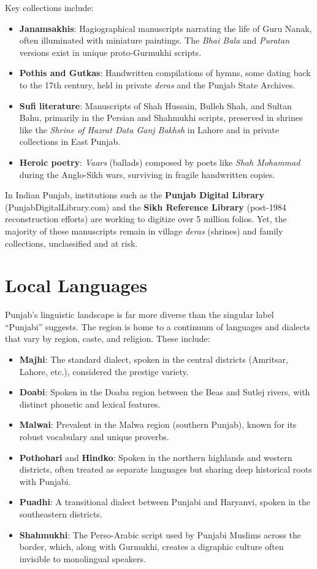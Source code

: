 \documentclass{article}
\begin{document}
Key collections include:
\begin{itemize}
    \item \textbf{Janamsakhis}: Hagiographical manuscripts narrating the life of Guru Nanak, often illuminated with miniature paintings. The \textit{Bhai Bala} and \textit{Puratan} versions exist in unique proto-Gurmukhi scripts.
    \item \textbf{Pothis and Gutkas}: Handwritten compilations of hymns, some dating back to the 17th century, held in private \textit{deras} and the Punjab State Archives.
    \item \textbf{Sufi literature}: Manuscripts of Shah Hussain, Bulleh Shah, and Sultan Bahu, primarily in the Persian and Shahmukhi scripts, preserved in shrines like the \textit{Shrine of Hazrat Data Ganj Bakhsh} in Lahore and in private collections in East Punjab.
    \item \textbf{Heroic poetry}: \textit{Vaars} (ballads) composed by poets like \textit{Shah Mohammad} during the Anglo-Sikh wars, surviving in fragile handwritten copies.
\end{itemize}

In Indian Punjab, institutions such as the \textbf{Punjab Digital Library} (PunjabDigitalLibrary.com) and the \textbf{Sikh Reference Library} (post-1984 reconstruction efforts) are working to digitize over 5 million folios. Yet, the majority of these manuscripts remain in village \textit{deras} (shrines) and family collections, unclassified and at risk.

\section{Local Languages}
Punjab’s linguistic landscape is far more diverse than the singular label “Punjabi” suggests. The region is home to a continuum of languages and dialects that vary by region, caste, and religion. These include:

\begin{itemize}
    \item \textbf{Majhi}: The standard dialect, spoken in the central districts (Amritsar, Lahore, etc.), considered the prestige variety.
    \item \textbf{Doabi}: Spoken in the Doaba region between the Beas and Sutlej rivers, with distinct phonetic and lexical features.
    \item \textbf{Malwai}: Prevalent in the Malwa region (southern Punjab), known for its robust vocabulary and unique proverbs.
    \item \textbf{Pothohari} and \textbf{Hindko}: Spoken in the northern highlands and western districts, often treated as separate languages but sharing deep historical roots with Punjabi.
    \item \textbf{Puadhi}: A transitional dialect between Punjabi and Haryanvi, spoken in the southeastern districts.
    \item \textbf{Shahmukhi}: The Perso-Arabic script used by Punjabi Muslims across the border, which, along with Gurmukhi, creates a digraphic culture often invisible to monolingual speakers.
\end{itemize}
\end{document}
